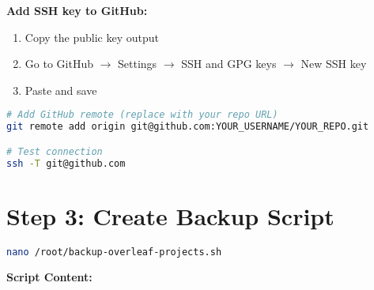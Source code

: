 \textbf{Add SSH key to GitHub:}
\begin{enumerate}
    \item Copy the public key output
    \item Go to GitHub $\rightarrow$ Settings $\rightarrow$ SSH and GPG keys $\rightarrow$ New SSH key
    \item Paste and save
\end{enumerate}

\begin{lstlisting}[language=bash]
# Add GitHub remote (replace with your repo URL)
git remote add origin git@github.com:YOUR_USERNAME/YOUR_REPO.git

# Test connection
ssh -T git@github.com
\end{lstlisting}

\section{Step 3: Create Backup Script}

\begin{lstlisting}[language=bash]
nano /root/backup-overleaf-projects.sh
\end{lstlisting}

\textbf{Script Content:}

